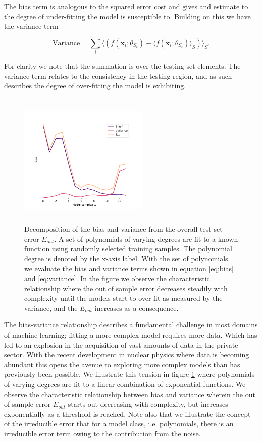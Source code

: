 \noindent The bias term is analogous to the squared error cost and gives and estimate to the degree of under-fitting the model is susceptible to. Building on this we have the variance term 

\begin{equation}\label{eq:variance}
\text{Variance} = \sum_i \langle (f(\mathbf{x}_i; \theta_{S_t}) - \langle f(\mathbf{x}_i; \theta_{S_t}) \rangle_S)\rangle_S.
\end{equation}

\noindent For clarity we note that the summation is over the testing set elements. The variance term relates to the consistency in the testing region, and as such describes the degree of over-fitting the model is exhibiting.

\begin{figure}
\centering
\includegraphics[width=0.55\textwidth, height=6.5cm]{../figures/bias_var_degree.pdf}
\caption[Bias-variance decomposition ]{Decomposition of the bias and variance from the overall test-set error $E_{out}$. A set of polynomials of varying degrees are fit to a known function using randomly selected training samples. The polynomial degree is denoted by the x-axis label. With the set of polynomials we evaluate the bias and variance terms shown in equation \ref{eq:bias} and \ref{eq:variance}. In the figure we observe the characteristic relationship where the out of sample error decreases steadily with complexity until the models start to over-fit as measured by the variance, and the $E_{out}$ increases as a consequence.}\label{fig:bv}
\end{figure}

The bias-variance relationship describes a fundamental challenge in most domains of machine learning; fitting a more complex model requires more data. Which has led to an explosion in the acquisition of vast amounts of data in the private sector. With the recent development in nuclear physics where data is becoming abundant this opens the avenue to exploring more complex models than has previously been possible. We illustrate this tension in figure \ref{fig:bv} where polynomials of varying degrees are fit to a linear combination of exponential functions. We observe the characteristic relationship between bias and variance wherein the out of sample error $E_{out}$ starts out decreasing with complexity, but increases exponentially as a threshold is reached. Note also that we illustrate the concept of the irreducible error that for a model class, i.e. polynomials, there is an irreducible error term owing to the contribution from the noise. 
